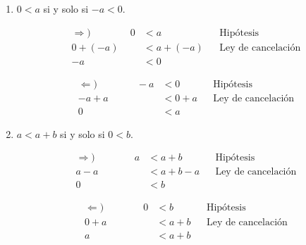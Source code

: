 \begin{enumerate}[label=\alph*)]
 \begin{enumerate}[label=\roman*)]
  \item $0<a$ si y solo si $-a<0$.
  \begin{center}\vspace{-1em}
   \begin{minipage}[l]{.5\linewidth}
    \begin{align*}
     \Rightarrow) \qquad \qquad
     0 &< a && \text{Hipótesis}\\
     0 + (-a) &< a + (-a) && \text{Ley de cancelación}\\
     -a &< 0%
    \end{align*}
  \end{minipage}%
  \begin{minipage}[r]{.5\linewidth}
   \begin{align*}
    \Leftarrow) \qquad \qquad
    -a &< 0 && \text{Hipótesis}\\
    -a + a &< 0 + a && \text{Ley de cancelación}\\
    0 &< a%
   \end{align*}
  \end{minipage}
  \end{center}

  \item $a<a+b$ si y solo si $0<b$.
  \begin{center}\vspace{-1em}
  \begin{minipage}[l]{.5\linewidth}
   \begin{align*}
    \Rightarrow) \qquad \qquad
    a &< a + b && \text{Hipótesis}\\
    a -a &< a + b - a && \text{Ley de cancelación}\\
    0 &< b%
   \end{align*}
  \end{minipage}%
  \begin{minipage}[r]{.5\linewidth}
   \begin{align*}
    \Leftarrow) \qquad \qquad
    0 &< b && \text{Hipótesis}\\
    0 + a &< a + b && \text{Ley de cancelación}\\
    a &< a + b%
   \end{align*}
  \end{minipage}
  \end{center}
  

\end{enumerate}
\end{enumerate}
